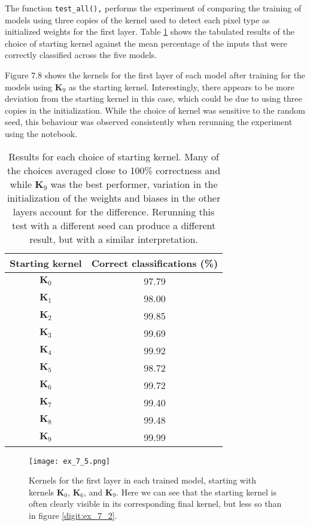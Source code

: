 \documentclass{somasmsc}
\begin{document}
\begin{exa}
The function \verb|test_all(),| performs the experiment of comparing the training of models using three copies of the kernel used to detect each pixel type as initialized weights for the first layer. Table \ref{digit:t1} shows the tabulated results of the choice of starting kernel against the mean percentage of the inputs that were correctly classified across the five models.

Figure 7.8 shows the kernels for the first layer of each model after training for the models using $\mathbf{K}_9$ as the starting kernel. Interestingly, there appears to be more deviation from the starting kernel in this case, which could be due to using three copies in the initialization. While the choice of kernel was sensitive to the random seed, this behaviour was observed consistently when rerunning the experiment using the notebook.

\begin{table}[h!]
\centering
\begin{tabular}{ |c|c| }
 \hline
  Starting kernel & Correct classifications (\%) \\
 \hline
 $\mathbf{K}_0$ & 97.79 \\
 $\mathbf{K}_1$ & 98.00 \\
 $\mathbf{K}_2$ & 99.85 \\
 $\mathbf{K}_3$ & 99.69 \\
 $\mathbf{K}_4$ & 99.92 \\
 $\mathbf{K}_5$ & 98.72 \\
 $\mathbf{K}_6$ & 99.72 \\
 $\mathbf{K}_7$ & 99.40 \\
 $\mathbf{K}_8$ & 99.48 \\
 $\mathbf{K}_9$ & 99.99 \\
 \hline
\end{tabular}
\caption{Results for each choice of starting kernel. Many of the choices averaged close to 100\% correctness and while $\mathbf{K}_9$ was the best performer, variation in the initialization of the weights and biases in the other layers account for the difference. Rerunning this test with a different seed can produce a different result, but with a similar interpretation.}
\label{digit:t1}
\end{table}

\begin{figure}[H]\label{digit:ex_7_5}
\begin{center}
\texttt{[image: ex\_7\_5.png]}
\end{center}
\caption{Kernels for the first layer in each trained model, starting with kernels $\mathbf{K}_0$, $\mathbf{K}_6$, and $\mathbf{K}_9$. Here we can see that the starting kernel is often clearly visible in its corresponding final kernel, but less so than in figure \ref{digit:ex_7_2}.}
\end{figure}
\end{exa}
\end{document}
